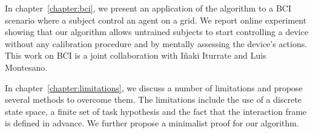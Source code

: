 In chapter~\ref{chapter:bci}, we present an application of the algorithm to a BCI scenario where a subject control an agent on a grid. We report online experiment showing that our algorithm allows untrained subjects to start controlling a device without any calibration procedure and by mentally assessing the device's actions. This work on BCI is a joint collaboration with I{\~n}aki Iturrate and Luis Montesano.

In chapter~\ref{chapter:limitations}, we discuss a number of limitations and propose several methods to overcome them. The limitations include the use of a discrete state space, a finite set of task hypothesis and the fact that the interaction frame is defined in advance. We further propose a minimalist proof for our algorithm.
